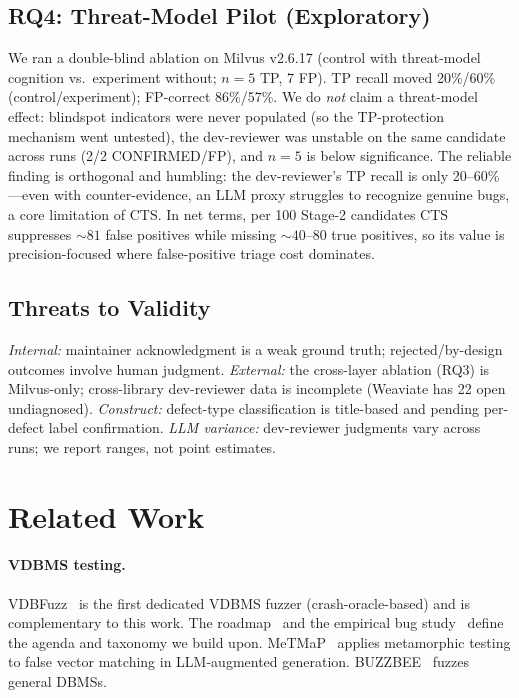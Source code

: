 \documentclass[sigconf, anonymous, review]{acmart}
\newcommand{\added}[1]{{\color{blue}#1}}
\begin{document}
\subsection{RQ4: Threat-Model Pilot (Exploratory)}\label{sec:eval-tm}
We ran a double-blind ablation on Milvus v2.6.17 (control with threat-model cognition vs.\ experiment without; $n{=}5$ TP, 7 FP). TP recall moved 20\%/60\% (control/experiment); FP-correct 86\%/57\%. We do \emph{not} claim a threat-model effect: blindspot indicators were never populated (so the TP-protection mechanism went untested), the dev-reviewer was unstable on the same candidate across runs (2/2 CONFIRMED/FP), and $n{=}5$ is below significance. The reliable finding is orthogonal and humbling: the dev-reviewer's TP recall is only 20--60\%---even with counter-evidence, an LLM proxy struggles to recognize genuine bugs, a core limitation of CTS.\added{ In net terms, per 100 Stage-2 candidates CTS suppresses ${\sim}81$ false positives while missing ${\sim}40$--$80$ true positives, so its value is precision-focused where false-positive triage cost dominates.}

\subsection{Threats to Validity}
\emph{Internal:} maintainer acknowledgment is a weak ground truth; rejected/by-design outcomes involve human judgment. \emph{External:} the cross-layer ablation (RQ3) is Milvus-only; cross-library dev-reviewer data is incomplete (Weaviate has 22 open undiagnosed). \emph{Construct:} defect-type classification is title-based and pending per-defect label confirmation. \emph{LLM variance:} dev-reviewer judgments vary across runs; we report ranges, not point estimates.

\section{Related Work}\label{sec:rw}
\paragraph{VDBMS testing.} VDBFuzz~\cite{vdbfuzz26} is the first dedicated VDBMS fuzzer (crash-oracle-based) and is complementary to this work. The roadmap~\cite{roadmap25} and the empirical bug study~\cite{bugstudy25} define the agenda and taxonomy we build upon. MeTMaP~\cite{metmap24} applies metamorphic testing to false vector matching in LLM-augmented generation. BUZZBEE~\cite{buzzbee24} fuzzes general DBMSs.
\end{document}
